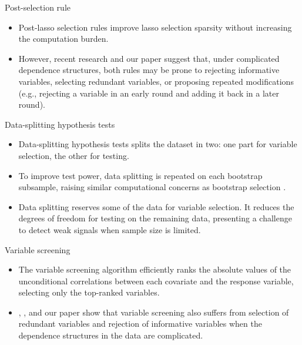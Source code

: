 \documentclass{beamer}
\begin{document}
\begin{frame}{Post-selection rule}
  \begin{itemize}
    \item Post-lasso selection rules \citep{ghaoui2010safe, tibshirani2012strong} improve lasso selection sparsity without increasing the computation burden.
    
    \item However, recent research \citep{wang2014safe, zeng2017efficient} and our paper suggest that, under complicated dependence structures, both rules may be prone to rejecting informative variables, selecting redundant variables, or proposing repeated modifications (e.g., rejecting a variable in an early round and adding it back in a later round).
  \end{itemize}
\end{frame}


\begin{frame}{Data-splitting hypothesis tests}

  \begin{itemize}
    \item Data-splitting hypothesis tests \citep{wasserman2009high, meinshausen2009p,romano2019multiple, diciccio2020exact} splits the dataset in two: one part for variable selection, the other for testing. 
    
    \item To improve test power, data splitting is repeated on each bootstrap subsample, raising similar computational concerns as bootstrap selection \citep{bach2008bolasso}.
    
    \item Data splitting reserves some of the data for variable selection. It reduces the degrees of freedom for testing on the remaining data, presenting a challenge to detect weak signals when sample size is limited. \citep{diciccio2020exact}
  \end{itemize}
\end{frame}


\begin{frame}{Variable screening}

  \begin{itemize}
    \item The variable screening algorithm \citep{fan2008sure, hall2009using,hall2009usingb, li2012robust, li2012feature} efficiently ranks the absolute values of the unconditional correlations between each covariate and the response variable, selecting only the top-ranked variables.
    
    \item \citet{fan2008sure}, \citet{barut2016conditional}, and our paper show that variable screening also suffers from selection of redundant variables and rejection of informative variables when the dependence structures in the data are complicated. 
  \end{itemize}
\end{frame}
\end{document}
